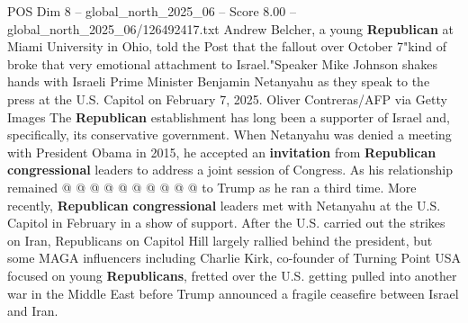 \begin{textsample}{POS Dim 8 – global\_north\_2025\_06 – Score 8.00 – global\_north\_2025\_06/126492417.txt}
Andrew Belcher, a young \textbf{Republican} at Miami University in Ohio, told the Post that the fallout over October 7"kind of broke that very emotional attachment to Israel."Speaker Mike Johnson shakes hands with Israeli Prime Minister Benjamin Netanyahu as they speak to the press at the U.S.
Capitol on February 7, 2025.
Oliver Contreras/AFP via Getty Images The \textbf{Republican} establishment has long been a supporter of Israel and, specifically, its conservative government.
When Netanyahu was denied a meeting with President Obama in 2015, he accepted an \textbf{invitation} from \textbf{Republican} \textbf{congressional} leaders to address a joint session of Congress.
As his relationship remained @ @ @ @ @ @ @ @ @ @ to Trump as he ran a third time.
More recently, \textbf{Republican} \textbf{congressional} leaders met with Netanyahu at the U.S.
Capitol in February in a show of support.
After the U.S. carried out the strikes on Iran, Republicans on Capitol Hill largely rallied behind the president, but some MAGA influencers including Charlie Kirk, co-founder of Turning Point USA focused on young \textbf{Republicans}, fretted over the U.S. getting pulled into another war in the Middle East before Trump announced a fragile ceasefire between Israel and Iran.

\end{textsample}
